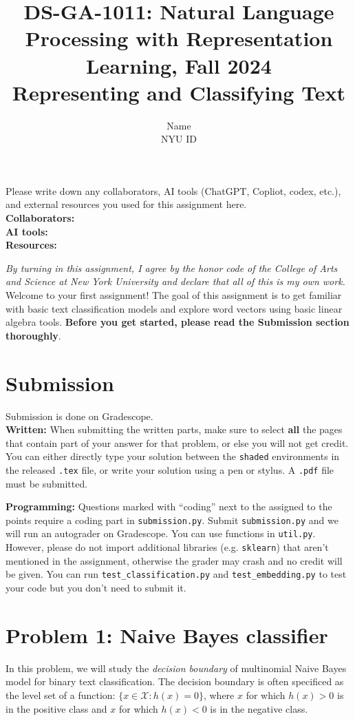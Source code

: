 \documentclass{article}
\title{\textbf{DS-GA-1011: Natural Language Processing with Representation Learning, Fall 2024} \\Representing and Classifying Text}
\author{Name \\
NYU ID}
\date{}
\theoremstyle{case}
\theoremstyle{definition}
\begin{document}
\maketitle
\begin{tcolorbox}
Please write down any collaborators, AI tools (ChatGPT, Copliot, codex, etc.), and external resources you used for this assignment here. \\
\textbf{Collaborators:} \\
\textbf{AI tools:} \\
\textbf{Resources:} 
\end{tcolorbox}
\textit{By turning in this assignment, I agree by the honor code of the College of Arts and Science at New York University and declare
that all of this is my own work.} \\


Welcome to your first assignment! The goal of this assignment is to get familiar with basic text classification models and explore word vectors using basic linear algebra tools.
\textbf{Before you get started, please read the Submission section thoroughly}.

\section*{Submission}
Submission is done on Gradescope. \\

\textbf{Written:} When submitting the written parts, make sure to select \textbf{all} the pages that contain part of your answer for that problem, or else you will not get credit.
You can either directly type your solution between the \texttt{shaded} environments in the released \texttt{.tex} file,
or write your solution using a pen or stylus. 
A \texttt{.pdf} file must be submitted.

\textbf{Programming:} Questions marked with ``coding'' next to the assigned to the points require a coding part in \texttt{submission.py}.
Submit \texttt{submission.py} and we will run an autograder on Gradescope. You can use functions in \texttt{util.py}. However, please do not import additional libraries (e.g. \texttt{sklearn}) that aren't mentioned in the assignment, otherwise the grader may crash and no credit will be given.
You can run \texttt{test\_classification.py} and \texttt{test\_embedding.py} to test your code but you don't need to submit it.

\section*{Problem 1: Naive Bayes classifier}
In this problem, we will study the \emph{decision boundary} of multinomial Naive Bayes model for binary text classification.
The decision boundary is often specificed as the level set of a function:
$\{x\in\mathcal{X} : h(x) = 0\}$,
where $x$ for which $h(x) > 0$ is in the positive class and
$x$ for which $h(x) < 0$ is in the negative class.
\end{document}
